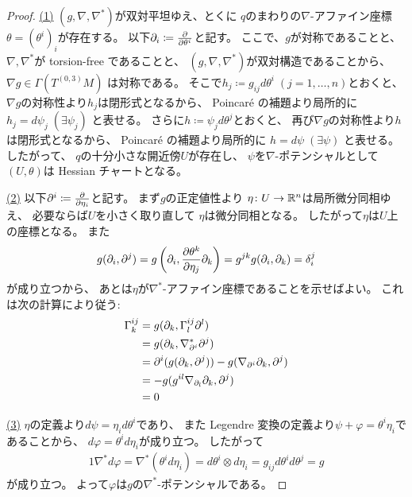 \documentclass[report]{jlreq}
\begin{document}
\begin{proof}
    \uline{(1)} \quad
    $(g, \nabla, \nabla^*)$が双対平坦ゆえ、とくに
    $q$のまわりの$\nabla$-アファイン座標$\theta = (\theta^i)_i$が存在する。
    以下$\del_i \coloneqq \deldel{\theta^i}$と記す。
    ここで、$g$が対称であることと、
    $\nabla, \nabla^*$が torsion-free であることと、
    $(g, \nabla, \nabla^*)$が双対構造であることから、
    $\nabla g \in \Gamma(T^{(0, 3)} M)$
    は対称である。
    そこで$h_j \coloneqq g_{ij} d\theta^i \; (j = 1, \ldots, n)$とおくと、
    $\nabla g$の対称性より$h_j$は閉形式となるから、
    Poincar\'e の補題より局所的に
    $h_j = d\psi_j \; (\exists \psi_j)$
    と表せる。
    さらに$h \coloneqq \psi_j d\theta^j$とおくと、
    再び$\nabla g$の対称性より$h$は閉形式となるから、
    Poincar\'e の補題より局所的に
    $h = d\psi \; (\exists \psi)$
    と表せる。
    したがって、
    $q$の十分小さな開近傍$U$が存在し、
    $\psi$を$\nabla$-ポテンシャルとして
    $(U, \theta)$は Hessian チャートとなる。

    \uline{(2)} \quad
    以下$\del^i \coloneqq \deldel{\eta_i}$と記す。
    まず$g$の正定値性より
    $\eta \colon U \to \mathbb{R}^n$は局所微分同相ゆえ、
    必要ならば$U$を小さく取り直して
    $\eta$は微分同相となる。
    したがって$\eta$は$U$上の座標となる。
    また
    \begin{equation}
        g(\del_i, \del^j)
            =
                g\myparen{
                    \del_i,
                    \deldel[\theta^k]{\eta_j} \del_k
                }
            =
                g^{jk}
                g(\del_i, \del_k)
            =
                \delta_i^j
    \end{equation}
    が成り立つから、
    あとは$\eta$が$\nabla^*$-アファイン座標であることを示せばよい。
    これは次の計算により従う:
    \begin{alignat}{1}
        \Gamma_k^{ij}
            &=
                g(\partial_k, \Gamma_l^{ij} \partial^l)
                \\
            &=
                g(\partial_k, \nabla^*_{\partial^i} \partial^j)
                \\
            &=
                \partial^i (g(\partial_k, \partial^j))
                - g(\nabla_{\partial^i} \partial_k, \partial^j)
                \\
            &=
                - g(g^{il} \nabla_{\partial_l} \partial_k, \partial^j)
                \\
            &=
                0
    \end{alignat}

    \uline{(3)} \quad
    $\eta$の定義より$d\psi = \eta_i d\theta^i$であり、
    また Legendre 変換の定義より$\psi + \varphi = \theta^i \eta_i$であることから、
    $d\varphi = \theta^i d\eta_i$が成り立つ。
    したがって
    \begin{alignat}{1}
        \nabla^* d\varphi
            =
                \nabla^* (\theta^i d\eta_i)
            =
                d\theta^i \otimes d\eta_i
            =
                g_{ij} d\theta^i d\theta^j
            =
                g
    \end{alignat}
    が成り立つ。
    よって$\varphi$は$g$の$\nabla^*$-ポテンシャルである。
\end{proof}
\end{document}
